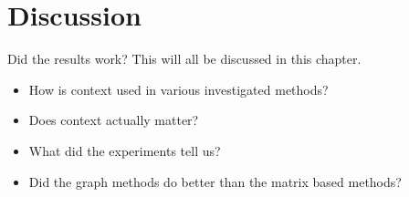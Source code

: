 \section{Discussion}\label{sec:discussion}
Did the results work? This will all be discussed in this chapter.

\begin{itemize}
    \item How is context used in various investigated methods?
    \item Does context actually matter?
    \item What did the experiments tell us?
    \item Did the graph methods do better than the matrix based methods?
\end{itemize}